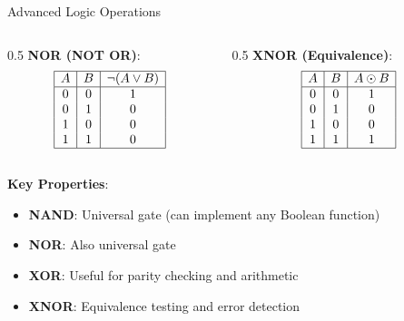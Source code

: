\documentclass[aspectratio=169,11pt]{beamer}
\newcommand{\concept}[1]{\textbf{\color{accentcolor}#1}}
\begin{document}
\begin{frame}{Advanced Logic Operations}
\begin{columns}
\begin{column}{0.5\textwidth}
\concept{NOR (NOT OR)}:
\[
\begin{array}{|c|c|c|}
\hline
A & B & \neg(A \lor B) \\
\hline
0 & 0 & 1 \\
0 & 1 & 0 \\
1 & 0 & 0 \\
1 & 1 & 0 \\
\hline
\end{array}
\]
\end{column}
\begin{column}{0.5\textwidth}
\concept{XNOR (Equivalence)}:
\[
\begin{array}{|c|c|c|}
\hline
A & B & A \odot B \\
\hline
0 & 0 & 1 \\
0 & 1 & 0 \\
1 & 0 & 0 \\
1 & 1 & 1 \\
\hline
\end{array}
\]
\end{column}
\end{columns}

\vspace{0.5cm}
\concept{Key Properties}:
\begin{itemize}
\item \textbf{NAND}: Universal gate (can implement any Boolean function)
\item \textbf{NOR}: Also universal gate
\item \textbf{XOR}: Useful for parity checking and arithmetic
\item \textbf{XNOR}: Equivalence testing and error detection
\end{itemize}
\end{frame}
\end{document}

